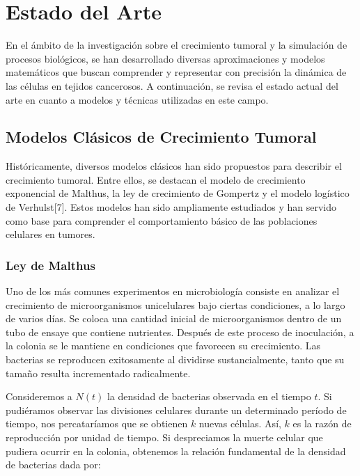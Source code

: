 \chapter{Estado del Arte}\label{chapter:state-of-the-art}

En el ámbito de la investigación sobre el crecimiento tumoral y la simulación de procesos biológicos, se han desarrollado diversas aproximaciones y modelos matemáticos que buscan comprender y representar con precisión la dinámica de las células en tejidos cancerosos. A continuación, se revisa el estado actual del arte en cuanto a modelos y técnicas utilizadas en este campo.

\section{Modelos Clásicos de Crecimiento Tumoral}

Históricamente, diversos modelos clásicos han sido propuestos para describir el crecimiento tumoral. Entre ellos, se destacan el modelo de crecimiento exponencial de Malthus, la ley de crecimiento de Gompertz y el modelo logístico de Verhulst[7]. Estos modelos han sido ampliamente estudiados y han servido como base para comprender el comportamiento básico de las poblaciones celulares en tumores.

\subsection{Ley de Malthus}

Uno de los más comunes experimentos en microbiología consiste en analizar el crecimiento de microorganismos unicelulares bajo ciertas condiciones, a lo largo de varios días. Se coloca una cantidad inicial de microorganismos dentro de un tubo de ensaye que contiene nutrientes. Después de este proceso de inoculación, a la colonia se le mantiene en condiciones que favorecen su crecimiento. Las bacterias se reproducen exitosamente al dividirse sustancialmente, tanto que su tamaño resulta incrementado radicalmente.

Consideremos a $N(t)$ la densidad de bacterias observada en el tiempo $t$. Si pudiéramos observar las divisiones celulares durante un determinado período de tiempo, nos percataríamos que se obtienen $k$ nuevas células. Así, $k$ es la razón de reproducción por unidad de tiempo. Si despreciamos la muerte celular que pudiera ocurrir en la colonia, obtenemos la relación fundamental de la densidad de bacterias dada por:


